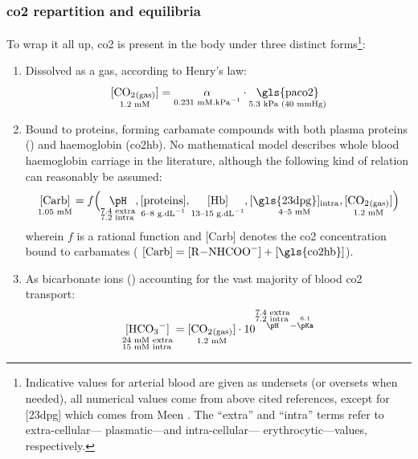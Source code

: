 \subsubsection{\texorpdfstring{\gls{co2}}{CO2} repartition and equilibria}

To wrap it all up, \gls{co2} is present in the body under three distinct forms\footnote{Indicative values for arterial blood are given as undersets (or oversets when needed), all numerical values come from above cited references, except for [\gls{23dpg}] which comes from Meen \etal{}\cite{meen1981}. The \enquote{extra} and \enquote{intra} terms refer to extra-cellular---\ie{} plasmatic---and intra-cellular---\ie{} erythrocytic---values, respectively.}:
\begin{enumerate}
	\item Dissolved as a gas, according to Henry's law:\begin{equation}
		\underset{\text{1.2~mM}}{\ce{[CO2_{(gas)}]}} = \underset{\text{0.231~mM.kPa$^{-1}$}}{\alpha} \cdot \underset{\text{5.3~kPa (40~mmHg)}}{\text{\gls{paco2}}}
	\end{equation}
	\item Bound to proteins, forming carbamate compounds with both plasma proteins () and haemoglobin (\gls{co2hb}). No mathematical model describes whole blood haemoglobin carriage in the literature, although the following kind of relation can reasonably be assumed:
	\begin{equation}\label{eq:co2hb:unknown_carb}
		\underset{\text{1.05~mM}}{[\text{Carb}]} = f\Bigl(
		\underset{
			\begin{subarray}{l}
				\text{7.4 extra}\\
				\text{7.2 intra}
			\end{subarray}}{\pH},
		\underset{\text{6--8~g.dL$^{-1}$}}{[\text{proteins}]}, 
		\underset{\text{13--15~g.dL$^{-1}$}}{[\text{Hb}]}, 
		\underset{\text{4--5~mM}}{[\text{\gls{23dpg}}]_{\text{intra}}},
		\underset{\text{1.2~mM}}{\ce{[CO2_{(gas)}]}} \Bigr)
	\end{equation} wherein $f$ is a rational function and [Carb] denotes the \gls{co2} concentration bound to carbamates (\ie{} $[\text{Carb}] = [\ce{R-NHCOO-}] + [\text{\gls{co2hb}}]$).
	\item As bicarbonate ions () accounting for the vast majority of blood \gls{co2} transport:\begin{equation}
		\underset{\begin{subarray}{l}
				\text{24~mM extra}\\
				\text{15~mM intra}
			\end{subarray}}{\ce{[HCO3^-]}} = \underset{\text{1.2~mM}}{\ce{[CO2_{(gas)}]}}\cdot 10^{\overset{\begin{subarray}{l}
					\text{7.4 extra}\\
					\text{7.2 intra}
			\end{subarray}}{\pH} - \overset{6.1\vphantom{p}}{\pKa}}
	\end{equation}
\end{enumerate}

